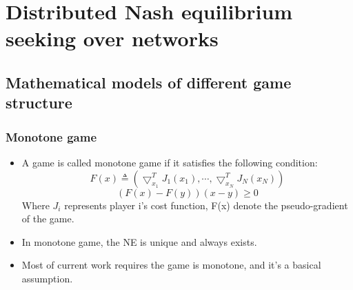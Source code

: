 \section[Distributed Nash equilibrium seeking over networks]{Distributed Nash equilibrium seeking over networks}\label{sec:2}

\subsection[Mathematical models of different game structure]{Mathematical models of different game structure}\label{subsec:2-2}

\begin{frame}
  \frametitle{\normalsize{Monotone game}}
  \begin{itemize}\small


      \item A game is called monotone game if it satisfies the following condition: \\
      $$ F(x) \triangleq (\bigtriangledown _{x_1}^T J_1 (x_1),\cdots , \bigtriangledown _{x_N}^T J_N (x_N) ) $$
      $$(F(x)-F(y))(x-y) \geqslant 0$$
      Where $J_i$ represents player i's cost function, F(x) denote the pseudo-gradient of the game.
      \vspace*{6pt} \\
      \item In monotone game, the NE is \textcolor[rgb]{0.00,0.00,1.00}{ unique and always exists.}
      \vspace*{6pt} \\
      \item Most of current work requires the game is monotone, and it's a basical assumption.
  \end{itemize} 
        
\end{frame}


